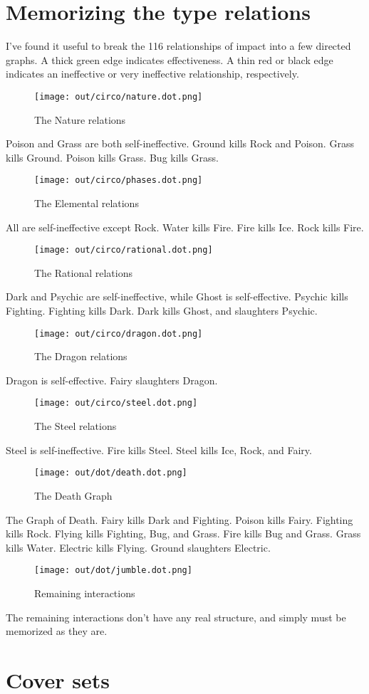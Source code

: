 \section{Memorizing the type relations}
I've found it useful to break the 116 relationships of impact into a few directed graphs.
A thick green edge indicates effectiveness.
A thin red or black edge indicates an ineffective or very ineffective relationship, respectively.

\begin{figure}[h]
\centering
\texttt{[image: out/circo/nature.dot.png]}
\caption{The Nature relations}
\end{figure}
Poison and Grass are both self-ineffective.
Ground kills Rock and Poison.
Grass kills Ground.
Poison kills Grass.
Bug kills Grass.

\begin{figure}[h]
\centering
\texttt{[image: out/circo/phases.dot.png]}
\caption{The Elemental relations}
\end{figure}
All are self-ineffective except Rock.
Water kills Fire.
Fire kills Ice.
Rock kills Fire.

\begin{figure}[h]
\centering
\texttt{[image: out/circo/rational.dot.png]}
\caption{The Rational relations}
\end{figure}
Dark and Psychic are self-ineffective, while Ghost is self-effective.
Psychic kills Fighting.
Fighting kills Dark.
Dark kills Ghost, and slaughters Psychic.

\begin{figure}
\centering
\texttt{[image: out/circo/dragon.dot.png]}
\caption{The Dragon relations}
\end{figure}
Dragon is self-effective.
Fairy slaughters Dragon.

\begin{figure}
\centering
\texttt{[image: out/circo/steel.dot.png]}
\caption{The Steel relations}
\end{figure}
Steel is self-ineffective.
Fire kills Steel.
Steel kills Ice, Rock, and Fairy.

\begin{figure}[h]
\centering
\texttt{[image: out/dot/death.dot.png]}
\caption{The Death Graph}
\end{figure}
The Graph of Death.
Fairy kills Dark and Fighting.
Poison kills Fairy.
Fighting kills Rock.
Flying kills Fighting, Bug, and Grass.
Fire kills Bug and Grass.
Grass kills Water.
Electric kills Flying.
Ground slaughters Electric.

\begin{figure}[h]
\centering
\texttt{[image: out/dot/jumble.dot.png]}
\caption{Remaining interactions}
\end{figure}
The remaining interactions don't have any real structure, and simply must be
memorized as they are.

\section{Cover sets}
